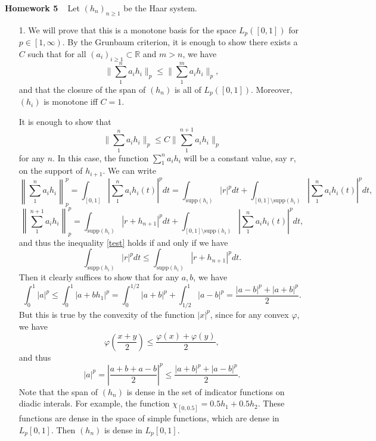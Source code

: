 \documentclass[11pt, reqno]{article}
\theoremstyle{plain}
\theoremstyle{definition}
\theoremstyle{remark}
\renewcommand{\phi}{\varphi}
\newcommand{\RR}{\mathbb{R}}
\begin{document}
\topmargin=-40pt
\renewcommand{\headrulewidth}{1pt}
\renewcommand{\headsep}{20pt}
\thispagestyle{fancy}

{\Huge \bfseries \noindent Homework 5}
\ \bigbreak
\noindent
Let $(h_n)_{n \geq 1}$ be the Haar system. 

\begin{enumerate}
    \item[1.] We will prove that this is a monotone basis for the space $L_p([0,1])$ for $p \in \left[1, \infty\right)$. 
    By the Grunbaum criterion, it is enough to show there exists a $C$ such that for all $(a_i)_{i \geq 1} \subset \RR$ and $m > n$, 
    we have 
    \[
        \|\sum_1^n a_i h_i\|_p \leq \|\sum_1^m a_i h_i\|_p,
    \]
    and that the closure of the span of $(h_n)$ is all of $L_p([0,1])$.
    Moreover, $(h_i)$ is monotone iff $C = 1$. 

    It is enough to show that 
    \begin{equation}\label{test}
        \|\sum_1^n a_i h_i\|_p \leq C\|\sum_1^{n+1} a_i h_i\|_p
    \end{equation}
    for any $n$. In this case, the function $\sum_1^n a_i h_i$ will be a constant value, say $r$, on the support of $h_{i + 1}$. 
    We can write
    \[
        \left\|\sum_1^n a_i h_i\right\|_p^p = \int_{[0,1]} {\left|\sum_1^n a_i h_i(t)\right|}^p dt = 
        \int_{\text{supp}(h_i)} {\left|r\right|}^p dt + 
        \int_{[0,1]\setminus\text{supp}(h_i)} {\left|\sum_1^n a_i h_i(t)\right|}^p dt,
    \]
    \[
        \left\|\sum_1^{n+1} a_i h_i\right\|_p^p = 
        \int_{\text{supp}(h_i)} {\left|r + h_{n + 1}\right|}^p dt + 
        \int_{[0,1]\setminus\text{supp}(h_i)} {\left|\sum_1^n a_i h_i(t)\right|}^p dt,
    \]
    and thus the inequality \ref{test} holds if and only if we have 
    \[
        \int_{\text{supp}(h_i)} {\left|r\right|}^p dt 
        \leq \int_{\text{supp}(h_i)} {\left|r + h_{n + 1}\right|}^p dt.
    \]
    Then it clearly suffices to show that for any $a, b$, we have 
    \[
        \int_0^1 |a|^p \leq \int_0^1 |a + bh_1|^p = \int_0^{1/2}|a+b|^p + \int_{1/2}^1 |a-b|^p = \frac{|a-b|^p + |a+b|^p}{2}.
    \]
    But this is true by the convexity of the function $|x|^p$, since for any convex $\phi$, we have
    \[
        \phi\left(\frac{x + y}{2}\right) \leq \frac{\phi(x) + \phi(y)}{2},
    \]
    and thus 
    \[
        |a|^p = {\left|\frac{a + b + a - b}{2}\right|}^p \leq \frac{|a + b|^p + |a - b|^p}{2}.
    \]
    \bigbreak
    Note that the span of $(h_n)$ is dense in the set of indicator functions on diadic interals. For example,
    the function $\chi_[0,0.5] = 0.5 h_1 + 0.5 h_2$. These functions are dense in the space of simple functions,
    which are dense in $L_p[0,1]$. Then $(h_n)$ is dense in $L_p[0,1]$.


\end{enumerate}
\end{document}
